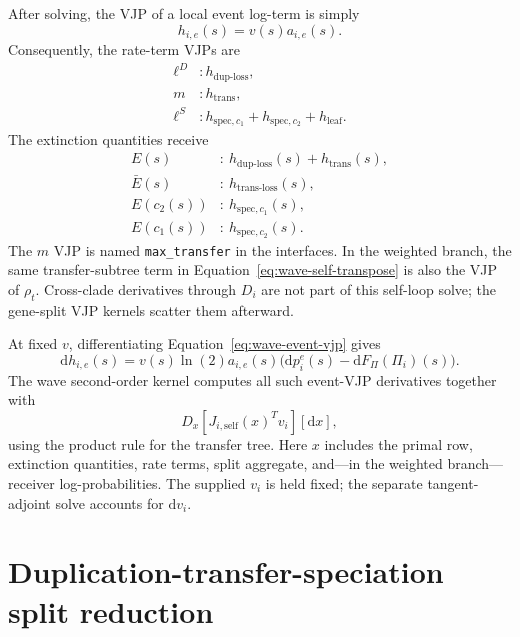 \documentclass[11pt]{article}
\newcommand{\dd}{\mathrm{d}}
\begin{document}
After solving, the VJP of a local event log-term is simply
\begin{equation}
  h_{i,e}(s)=v(s)a_{i,e}(s).
  \label{eq:wave-event-vjp}
\end{equation}
Consequently, the rate-term VJPs are
\begin{align}
  \ell^D &: h_{\mathrm{dup\text{-}loss}},\\
  m &: h_{\mathrm{trans}},\\
  \ell^S &: h_{\mathrm{spec},c_1}
    +h_{\mathrm{spec},c_2}+h_{\mathrm{leaf}}.
\end{align}
The extinction quantities receive
\begin{align}
  E(s)&:\ h_{\mathrm{dup\text{-}loss}}(s)+h_{\mathrm{trans}}(s),\\
  \bar E(s)&:\ h_{\mathrm{trans\text{-}loss}}(s),\\
  E(c_2(s))&:\ h_{\mathrm{spec},c_1}(s),\\
  E(c_1(s))&:\ h_{\mathrm{spec},c_2}(s).
\end{align}
The $m$ VJP is named \texttt{max\_transfer} in the interfaces.  In the
weighted branch, the same transfer-subtree term in
Equation~\eqref{eq:wave-self-transpose} is also the VJP of $\rho_t$.
Cross-clade derivatives through $D_i$ are not part of this self-loop solve;
the gene-split VJP kernels scatter them afterward.

At fixed $v$, differentiating Equation~\eqref{eq:wave-event-vjp} gives
\begin{equation}
  \dd h_{i,e}(s)
  =v(s)\ln(2)a_{i,e}(s)
    \bigl(\dd p_i^e(s)-\dd F_\Pi(\Pi_i)(s)\bigr).
  \label{eq:wave-event-so}
\end{equation}
The wave second-order kernel computes all such event-VJP derivatives together
with
\begin{equation}
  D_x[J_{i,\mathrm{self}}(x)^Tv_i][\dd x],
  \label{eq:wave-so}
\end{equation}
using the product rule for the transfer tree.  Here $x$ includes the primal
row, extinction quantities, rate terms, split aggregate, and---in the weighted
branch---receiver log-probabilities.  The supplied $v_i$ is held fixed; the
separate tangent-adjoint solve accounts for $\dd v_i$.

\section{Duplication-transfer-speciation split reduction}
\end{document}
